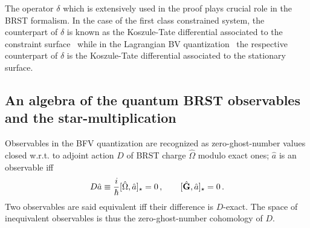 \documentclass[a4paper,11pt,oneside]{amsart}
\theoremstyle{plain}
\numberwithin{equation}{section} %
\numberwithin{figure}{section} %
\newcommand{\qcommut}[2]{[#1,#2]_\star}
\def\G{{ \bf G}}
\begin{document}
\noindent
The operator $\delta$ which is extensively used in the proof
plays crucial role in the BRST formalism.  In the case of
the first class constrained system, the counterpart of $\delta$
is known as the Koszule-Tate differential associated to the
constraint surface~\cite{[H-omega],[HTS]} while in the Lagrangian
BV quantization~\cite{[BV]} the respective counterpart
of $\delta$ is the Koszule-Tate differential associated
to the stationary surface.


\subsection{An algebra of the quantum BRST observables
and the star-multiplication}
Observables in the BFV quantization are
recognized as zero-ghost-number values
closed w.r.t. to adjoint action $D$ of
BRST charge $\hat\Omega$ modulo exact
ones; $\hat a$ is an observable iff
\begin{equation}
\label{eq:Observables-determin}
  D{\hat a} \equiv \frac{i}{\hbar}\qcommut{\hat\Omega}{\hat a}=0\,,
  \qquad
  \qcommut{\hat\G}{\hat a}=0\,.
\end{equation}
Two observables are said equivalent iff their
difference is $D$-exact.  The space of inequivalent
observables is thus the zero-ghost-number cohomology of $D$.
\end{document}
